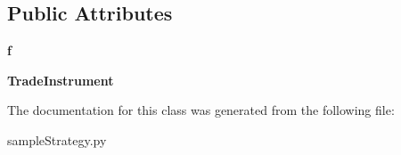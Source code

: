 \subsection*{Public Attributes}
\begin{DoxyCompactItemize}
\item 
\hypertarget{classsampleStrategy_1_1sample_a918c4c9d2bbf76d992818bbb9e560aa4}{{\bfseries f}}\label{classsampleStrategy_1_1sample_a918c4c9d2bbf76d992818bbb9e560aa4}

\item 
\hypertarget{classsampleStrategy_1_1sample_a6d2312273f20c1c5a07373b253e5e64d}{{\bfseries Trade\-Instrument}}\label{classsampleStrategy_1_1sample_a6d2312273f20c1c5a07373b253e5e64d}

\end{DoxyCompactItemize}


The documentation for this class was generated from the following file\-:\begin{DoxyCompactItemize}
\item 
sample\-Strategy.\-py\end{DoxyCompactItemize}
